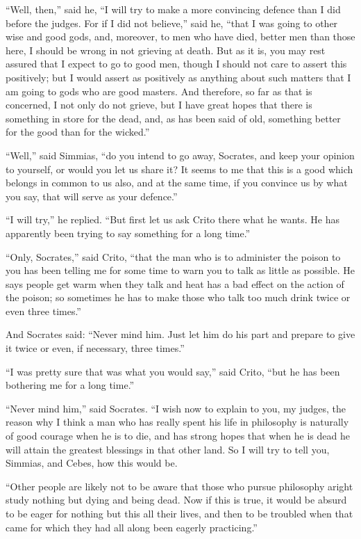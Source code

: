 \documentclass[letterpaper,12pt]{article}
\newcommand{\stephpag}[1]{\marginnote{\small\itshape\fontfamily{ppl}\selectfont #1}}
\begin{document}
\begin{drama}
``Well, then,'' said he, ``I will try to make a more convincing defence than I did before the judges. For if I did not believe,'' said he, ``that I was going to other wise and good gods, and, moreover, to men who have died, better men than those here, I should be wrong in not grieving at death. But as it is, you may rest assured \stephpag{c} that I expect to go to good men, though I should not care to assert this positively; but I would assert as positively as anything about such matters that I am going to gods who are good masters. And therefore, so far as that is concerned, I not only do not grieve, but I have great hopes that there is something in store for the dead, and, as has been said of old, something better for the good than for the wicked.''
 
``Well,'' said Simmias, ``do you intend to go away, Socrates, \stephpag{d} and keep your opinion to yourself, or would you let us share it? It seems to me that this is a good which belongs in common to us also, and at the same time, if you convince us by what you say, that will serve as your defence.''
 
``I will try,'' he replied. ``But first let us ask Crito there what he wants. He has apparently been trying to say something for a long time.''
 
``Only, Socrates,'' said Crito, ``that the man who is to administer the poison to you has been telling me for some time to warn you to talk as little as possible. He says people get warm when they talk and heat has a bad effect on the action of the poison; \stephpag{e} so sometimes he has to make those who talk too much drink twice or even three times.''
 
And Socrates said: ``Never mind him. Just let him do his part and prepare to give it twice or even, if necessary, three times.''
 
``I was pretty sure that was what you would say,'' said Crito, ``but he has been bothering me for a long time.''
 
``Never mind him,'' said Socrates. ``I wish now to explain to you, my judges, the reason why I think a man who has really spent his life in philosophy is naturally of good courage \stephpag{64 a} when he is to die, and has strong hopes that when he is dead he will attain the greatest blessings in that other land. So I will try to tell you, Simmias, and Cebes, how this would be.
 
``Other people are likely not to be aware that those who pursue philosophy aright study nothing but dying and being dead. Now if this is true, it would be absurd to be eager for nothing but this all their lives, and then to be troubled when that came for which they had all along been eagerly practicing.''
 

\end{drama}
\end{document}
